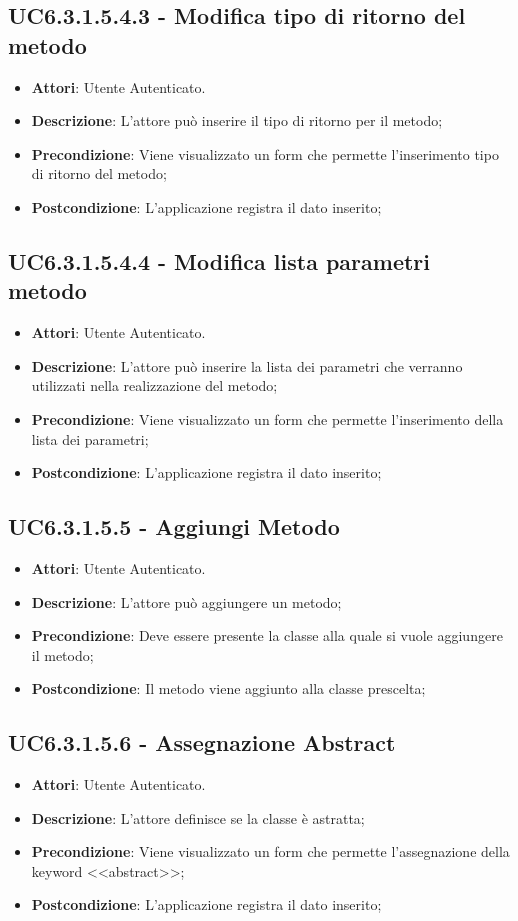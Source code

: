 \subsection{UC6.3.1.5.4.3 - Modifica tipo di ritorno del metodo} 
\label{ssec:UC6.3.1.5.4.3} 
\begin{itemize} 
\item \textbf{Attori}: Utente Autenticato.
\item \textbf{Descrizione}: L'attore può inserire il tipo di ritorno per il metodo;
\item \textbf{Precondizione}: Viene visualizzato un form che permette l'inserimento tipo di ritorno del metodo;
\item \textbf{Postcondizione}: L'applicazione registra il dato inserito;
\end{itemize} 
\subsection{UC6.3.1.5.4.4 - Modifica lista parametri metodo} 
\label{ssec:UC6.3.1.5.4.4} 
\begin{itemize} 
\item \textbf{Attori}: Utente Autenticato.
\item \textbf{Descrizione}: L'attore può inserire la lista dei parametri che verranno utilizzati nella realizzazione del metodo;
\item \textbf{Precondizione}: Viene visualizzato un form che permette l'inserimento della lista dei parametri;
\item \textbf{Postcondizione}: L'applicazione registra il dato inserito;
\end{itemize} 
\subsection{UC6.3.1.5.5 - Aggiungi Metodo} 
\label{ssec:UC6.3.1.5.5} 
\begin{itemize} 
\item \textbf{Attori}: Utente Autenticato.
\item \textbf{Descrizione}: L'attore può aggiungere un metodo;
\item \textbf{Precondizione}: Deve essere presente la classe alla quale si vuole aggiungere il metodo;
\item \textbf{Postcondizione}: Il metodo viene aggiunto alla classe prescelta;
\end{itemize} 
\subsection{UC6.3.1.5.6 - Assegnazione Abstract} 
\label{ssec:UC6.3.1.5.6} 
\begin{itemize} 
\item \textbf{Attori}: Utente Autenticato.
\item \textbf{Descrizione}: L'attore definisce se la classe è astratta;
\item \textbf{Precondizione}: Viene visualizzato un form che permette l'assegnazione della keyword <<abstract>>;
\item \textbf{Postcondizione}: L'applicazione registra il dato inserito;
\end{itemize} 
